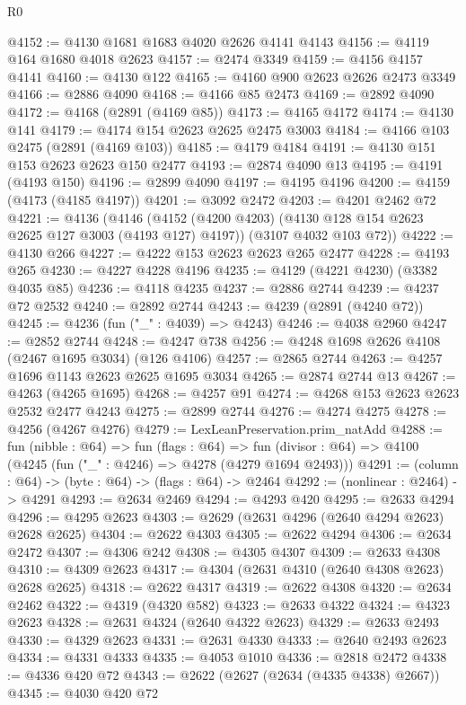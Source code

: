 \begin{lexlean}{R0}
\begin{coremodule}
@4152 := @4130 @1681 @1683 @4020 @2626 @4141 @4143
@4156 := @4119 @164 @1680 @4018 @2623
@4157 := @2474 @3349
@4159 := @4156 @4157 @4141
@4160 := @4130 @122
@4165 := @4160 @900 @2623 @2626 @2473 @3349
@4166 := @2886 @4090
@4168 := @4166 @85 @2473
@4169 := @2892 @4090
@4172 := @4168 (@2891 (@4169 @85))
@4173 := @4165 @4172
@4174 := @4130 @141
@4179 := @4174 @154 @2623 @2625 @2475 @3003
@4184 := @4166 @103 @2475 (@2891 (@4169 @103))
@4185 := @4179 @4184
@4191 := @4130 @151 @153 @2623 @2623 @150 @2477
@4193 := @2874 @4090 @13
@4195 := @4191 (@4193 @150)
@4196 := @2899 @4090
@4197 := @4195 @4196
@4200 := @4159 (@4173 (@4185 @4197))
@4201 := @3092 @2472
@4203 := @4201 @2462 @72
@4221 := @4136
    (@4146
      (@4152 (@4200 @4203) (@4130 @128 @154 @2623 @2625 @127 @3003 (@4193 @127) @4197))
      (@3107 @4032 @103 @72))
@4222 := @4130 @266
@4227 := @4222 @153 @2623 @2623 @265 @2477
@4228 := @4193 @265
@4230 := @4227 @4228 @4196
@4235 := @4129 (@4221 @4230) (@3382 @4035 @85)
@4236 := @4118 @4235
@4237 := @2886 @2744
@4239 := @4237 @72 @2532
@4240 := @2892 @2744
@4243 := @4239 (@2891 (@4240 @72))
@4245 := @4236 (fun ("_" : @4039) => @4243)
@4246 := @4038 @2960
@4247 := @2852 @2744
@4248 := @4247 @738
@4256 := @4248 @1698 @2626 @4108 (@2467 @1695 @3034) (@126 @4106)
@4257 := @2865 @2744
@4263 := @4257 @1696 @1143 @2623 @2625 @1695 @3034
@4265 := @2874 @2744 @13
@4267 := @4263 (@4265 @1695)
@4268 := @4257 @91
@4274 := @4268 @153 @2623 @2623 @2532 @2477 @4243
@4275 := @2899 @2744
@4276 := @4274 @4275
@4278 := @4256 (@4267 @4276)
@4279 := LexLeanPreservation.prim_natAdd
@4288 := fun (nibble : @64) =>
  fun (flags : @64) =>
  fun (divisor : @64) => @4100 (@4245 (fun ("_" : @4246) => @4278 (@4279 @1694 @2493)))
@4291 := (column : @64) -> (byte : @64) -> (flags : @64) -> @2464
@4292 := (nonlinear : @2464) -> @4291
@4293 := @2634 @2469
@4294 := @4293 @420
@4295 := @2633 @4294
@4296 := @4295 @2623
@4303 := @2629 (@2631 @4296 (@2640 @4294 @2623) @2628 @2625)
@4304 := @2622 @4303
@4305 := @2622 @4294
@4306 := @2634 @2472
@4307 := @4306 @242
@4308 := @4305 @4307
@4309 := @2633 @4308
@4310 := @4309 @2623
@4317 := @4304 (@2631 @4310 (@2640 @4308 @2623) @2628 @2625)
@4318 := @2622 @4317
@4319 := @2622 @4308
@4320 := @2634 @2462
@4322 := @4319 (@4320 @582)
@4323 := @2633 @4322
@4324 := @4323 @2623
@4328 := @2631 @4324 (@2640 @4322 @2623)
@4329 := @2633 @2493
@4330 := @4329 @2623
@4331 := @2631 @4330
@4333 := @2640 @2493 @2623
@4334 := @4331 @4333
@4335 := @4053 @1010
@4336 := @2818 @2472
@4338 := @4336 @420 @72
@4343 := @2622 (@2627 (@2634 (@4335 @4338) @2667))
@4345 := @4030 @420 @72

\end{coremodule}
\end{lexlean}
